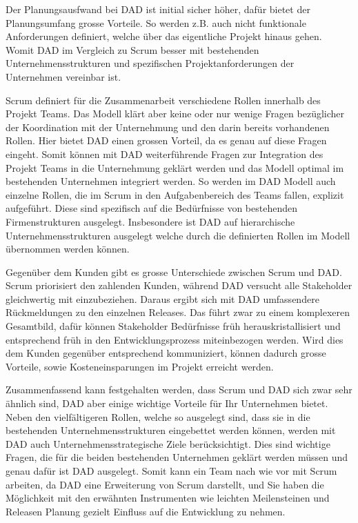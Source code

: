 Der Planungsausfwand bei DAD ist initial sicher höher, dafür bietet der Planungsumfang grosse Vorteile. So werden z.B. auch nicht funktionale Anforderungen definiert, welche über das eigentliche Projekt hinaus gehen. Womit DAD im Vergleich zu Scrum besser mit bestehenden Unternehmensstrukturen und spezifischen Projektanforderungen der Unternehmen vereinbar ist.

Scrum definiert für die Zusammenarbeit verschiedene Rollen innerhalb des Projekt Teams. Das Modell klärt aber keine oder nur wenige Fragen bezüglicher der Koordination mit der Unternehmung und den darin bereits vorhandenen Rollen. Hier bietet DAD einen grossen Vorteil, da es genau auf diese Fragen eingeht. Somit können mit DAD weiterführende Fragen zur Integration des Projekt Teams in die Unternehmung geklärt werden und das Modell optimal im bestehenden Unternehmen integriert werden. So werden im DAD Modell auch einzelne Rollen, die im Scrum in den Aufgabenbereich des Teams fallen, explizit aufgeführt. Diese sind spezifisch auf die Bedürfnisse von bestehenden Firmenstrukturen ausgelegt. Insbesondere ist DAD auf hierarchische Unternehmensstrukturen ausgelegt welche durch die definierten Rollen im Modell übernommen werden können.

Gegenüber dem Kunden gibt es grosse Unterschiede zwischen Scrum und DAD. Scrum priorisiert den zahlenden Kunden, während DAD versucht alle Stakeholder gleichwertig mit einzubeziehen. Daraus ergibt sich mit DAD umfassendere Rückmeldungen zu den einzelnen Releases. Das führt zwar zu einem komplexeren Gesamtbild, dafür können Stakeholder Bedürfnisse früh herauskristallisiert und entsprechend früh in den Entwicklungsprozess miteinbezogen werden. Wird dies dem Kunden gegenüber entsprechend kommuniziert, können dadurch grosse Vorteile, sowie Kosteneinsparungen im Projekt erreicht werden. 

Zusammenfassend kann festgehalten werden, dass Scrum und DAD sich zwar sehr ähnlich sind, DAD aber einige wichtige Vorteile für Ihr Unternehmen bietet. Neben den vielfältigeren Rollen, welche so ausgelegt sind, dass sie in die bestehenden Unternehmensstrukturen eingebettet werden können, werden mit DAD auch Unternehmensstrategische Ziele berücksichtigt. Dies sind wichtige Fragen, die für die beiden bestehenden Unternehmen geklärt werden müssen und genau dafür ist DAD ausgelegt. Somit kann ein Team nach wie vor mit Scrum arbeiten, da DAD eine Erweiterung von Scrum darstellt, und Sie haben die Möglichkeit mit den erwähnten Instrumenten wie leichten Meilensteinen und Releasen Planung gezielt Einfluss auf die Entwicklung zu nehmen.

